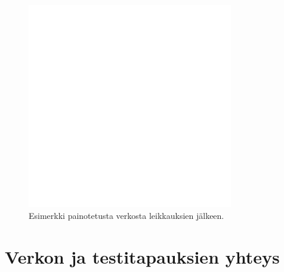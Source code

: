   \begin{figure}[H]
    \centering
    \includegraphics[width=0.8\textwidth]{assets/painotetun-verkon-esimerkki-jalkeen.png}
    \caption{Esimerkki painotetusta verkosta leikkauksien jälkeen.}
    \label{fig:painotetun-verkon-esimerkki-jalkeen}
  \end{figure}

\section{Verkon ja testitapauksien yhteys} \label{ch:10_verkon_ja_testitapauksien_yhteys}


